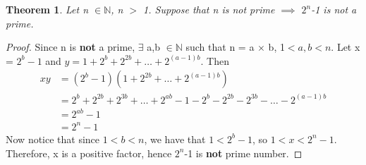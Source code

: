 \documentclass[12pt,a4paper]{article}
\newtheorem{thm}{Theorem}
\begin{document}
\begin{thm}
Let n $\in \mathbb{N}$, n $>$ 1. Suppose that n is not prime $\implies$ $2^{n}$-1 is not a prime.
\end{thm}

\begin{proof}
	Since n is \textbf{not} a prime, $\exists$ a,b $\in \mathbb{N}$ such that n = a $\times$ b, 1$<a,b<n$. Let x = $2^{b}-1$ and $y=1+2^{b}+2^{2b}+\dots+2^{(a-1)b}$. Then
	\begin{align*}
		xy&=(2^{b}-1)(1+2^{2b}+\dots+2^{(a-1)b})\\
		&=2^{b}+2^{2b}+2^{3b}+\dots+2^{ab}-1-2^{b}-2^{2b}-2^{3b}-\dots-2^{(a-1)b}\\
		&=2^{ab}-1\\
		&=2^{n}-1
	\end{align*}
Now notice that since $1< b < n$, we have that $1 < 2^{b} - 1$, so $1 < x < 2^{n}-1$.\\
Therefore, x is a positive factor, hence $2^{n}$-1 is \textbf{not} prime number.
\end{proof}
\newpage
\end{document}

